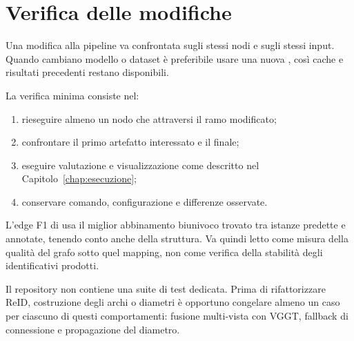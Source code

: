 \section{Verifica delle modifiche}

Una modifica alla pipeline va confrontata sugli stessi nodi e sugli stessi
input. Quando cambiano modello o dataset è preferibile usare una nuova
, così cache e risultati precedenti restano disponibili.

La verifica minima consiste nel:

\begin{enumerate}
  \item rieseguire almeno un nodo che attraversi il ramo modificato;
  \item confrontare il primo artefatto interessato e il
   finale;
  \item eseguire valutazione e visualizzazione come descritto nel
  Capitolo~\ref{chap:esecuzione};
  \item conservare comando, configurazione e differenze osservate.
\end{enumerate}

L'edge F1 di  usa il miglior abbinamento biunivoco trovato
tra istanze predette e annotate, tenendo conto anche della struttura. Va quindi
letto come misura della qualità del grafo sotto quel mapping, non come verifica
della stabilità degli identificativi prodotti.

Il repository non contiene una suite di test dedicata. Prima di rifattorizzare
ReID, costruzione degli archi o diametri è opportuno congelare almeno un caso
per ciascuno di questi comportamenti: fusione multi-vista con VGGT, fallback di
connessione e propagazione del diametro.
